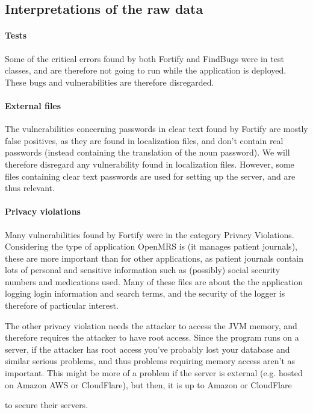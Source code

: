 \documentclass{report} %
\begin{document}
\subsection{Interpretations of the raw data}

\paragraph{Tests}
Some of the critical errors found by both Fortify and FindBugs were in test
classes, and are therefore not going to run while the application is deployed.
These bugs and vulnerabilities are therefore disregarded. 

\paragraph{External files}
The vulnerabilities concerning passwords in clear text found by Fortify are
mostly false positives, as they are found in localization files, and don't
contain real passwords (instead containing the translation of the noun
password). We will therefore disregard any vulnerability found in localization
files. However, some files containing clear text passwords are used for setting
up the server, and are thus relevant.

\paragraph{Privacy violations}
Many vulnerabilities found by Fortify were in the category Privacy Violations.
Considering the type of application OpenMRS is (it manages patient journals),
these are more important than for other applications, as patient journals
contain lots of personal and sensitive information such as (possibly) social security
numbers and medications used. Many of these files are about the the application
logging login information and search terms, and the security of the logger is therefore of
particular interest.

The other privacy violation needs the attacker to access the JVM memory, and
therefore requires the attacker to have root access. Since the program runs on a
server, if the attacker has root access you've probably lost your database and
similar serious problems, and thus problems requiring memory access aren't as
important. This might be more of a problem if the server is external (e.g.
hosted on Amazon AWS or CloudFlare), but then, it is up to Amazon or CloudFlare

to secure their servers.
\end{document}
